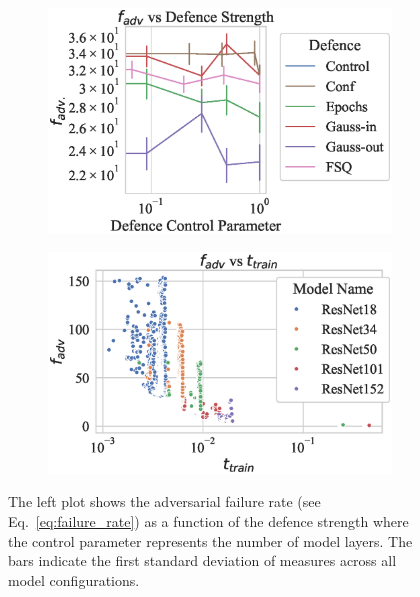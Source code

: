 \begin{figure}[!h]
    \centering
    \begin{subfigure}
        \centering
        \includegraphics[trim={0 20pt 0 10pt},clip,width=.4\textwidth]{cifar100/def_param_vs_adv_failure_rate.eps}
    \end{subfigure}
    \begin{subfigure}
        \centering
        \includegraphics[trim={0 20pt 0 10pt},clip,width=.4\textwidth]{cifar100/adv_failure_rate_vs_train_time.eps}
    \end{subfigure}
    \caption{The left plot shows the adversarial failure rate (see Eq.~\ref{eq:failure_rate}) as a function of the defence strength where the control parameter represents the number of model layers. The bars indicate the first standard deviation of measures across all model configurations.}
    \label{fig:failure_rate}
\end{figure}

